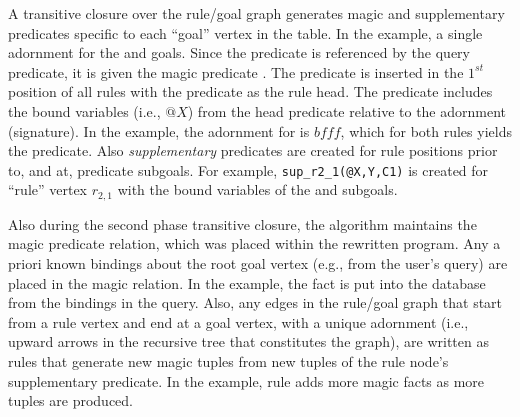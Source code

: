 A transitive closure over the rule/goal graph generates magic and supplementary
predicates specific to each ``goal'' vertex in the  table.  In
the example, a single adornment for the  and  goals.  Since
the  predicate is referenced by the query predicate, it is given the
magic predicate .  The  predicate is inserted
in the $1^{st}$ position of all rules with the  predicate as the rule
head.  The  predicate includes the bound variables (i.e., $@X$)
from the  head predicate relative to the  adornment
(signature).  In the example, the adornment for  is $bfff$, which for
both rules yields the  predicate.  Also
\emph{supplementary} predicates are created for rule positions prior to, and
at,  predicate subgoals.  For example, {\tt sup\_r2\_1(@X,Y,C1)} is
created for ``rule'' vertex $r_{2,1}$ with the bound variables of the
 and  subgoals.

Also during the second phase transitive closure, the algorithm maintains the
magic predicate relation, which was placed within the rewritten program.  Any a
priori known bindings about the root goal vertex (e.g., from the user's query)
are placed in the magic relation.  In the example, the fact
 is put into the database from the
bindings in the  query.  Also, any edges in the rule/goal graph that
start from a rule vertex and end at a goal vertex, with a unique adornment
(i.e., upward arrows in the recursive tree that constitutes the graph), are
written as rules that generate new magic tuples from new tuples of the rule
node's supplementary predicate.  In the example, rule  adds more
magic facts as more  tuples are produced.

